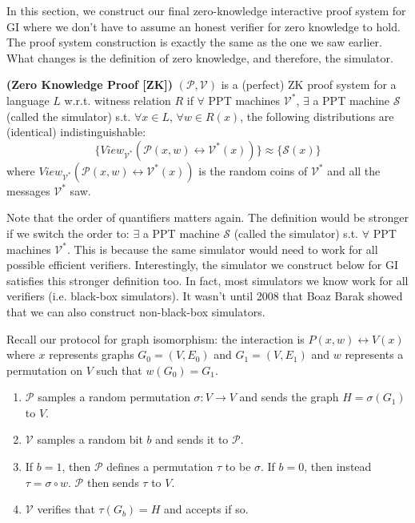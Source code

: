 In this section, we construct our final zero-knowledge interactive proof system for GI where we don't have to assume an honest verifier for zero knowledge to hold. The proof system construction is exactly the same as the one we saw earlier. What changes is the definition of zero knowledge, and therefore, the simulator. 

\begin{definition} {\normalfont\textbf{(Zero Knowledge Proof [ZK])}} 
	$(\mathcal{P},\mathcal{V})$ is a (perfect) ZK proof system for a language $L$ w.r.t. witness relation $R$ if $\forall$ PPT machines $\mathcal{V}^*$,
	$\exists$ a PPT machine $\mathcal{S}$ (called the simulator) s.t. $\forall x \in L$, $\forall w\in R(x)$, the following distributions are (identical) indistinguishable:
$$\{View_{\mathcal{V^*}}(\mathcal{P}(x,w) \leftrightarrow \mathcal{V^*}(x))\} \approx \{\mathcal{S}(x)\}$$
where $View_{\mathcal{V^*}}(\mathcal{P}(x,w) \leftrightarrow \mathcal{V^*}(x))$ is the random coins of $\mathcal{V^*}$ and all the messages $\mathcal{V^*}$ saw.
\end{definition}
\begin{remark}
	Note that the order of quantifiers matters again. The definition would be stronger if we switch the order to: $\exists$ a PPT machine $\mathcal{S}$ (called the simulator) s.t. $\forall$ PPT machines $\mathcal{V}^*$. This is because the same simulator would need to work for all possible efficient verifiers. Interestingly, the simulator we construct below for GI satisfies this stronger definition too. In fact, most simulators we know work for all verifiers (i.e. black-box simulators). It wasn't until 2008 that Boaz Barak showed that we can also construct non-black-box simulators. 
\end{remark}

Recall our protocol for graph isomorphism: the interaction is $P(x,w) \leftrightarrow V(x)$ where $x$ represents graphs $G_0 = (V, E_0)$ and $G_1 = (V, E_1)$ and $w$ represents a permutation on $V$ such that $w (G_0) = G_1$.

\begin{enumerate}
\item $\mathcal{P}$ samples a random permutation $\sigma: V \to V$ and sends the graph $H = \sigma(G_1)$ to $V$.

\item $\mathcal{V}$ samples a random bit $b$ and sends it to $\mathcal{P}$.

\item If $b = 1$, then $\mathcal{P}$ defines a permutation $\tau$ to be $\sigma$. If $b = 0$, then instead $\tau = \sigma \circ w$. $\mathcal{P}$ then sends $\tau$ to $V$.

\item $\mathcal{V}$ verifies that $\tau(G_b) = H$ and accepts if so.

\end{enumerate}

